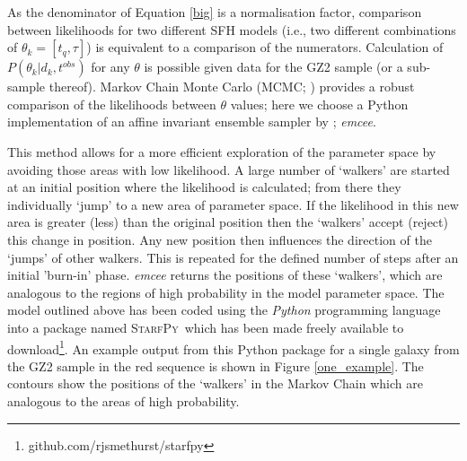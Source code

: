 \documentclass[useAMS,usenatbib]{mn2e}
\def\changed    {\color{titlecol} }
\def\starfpy {\textsc{StarfPy}}
\begin{document}
As the denominator of Equation \ref{big} is a normalisation factor, comparison between likelihoods for two different SFH models (i.e., two different combinations of $\theta_k = [t_q, \tau]$) is equivalent to a comparison of the numerators. Calculation of $P(\theta_k|d_k, t^{obs})$  for any $\theta$ is possible given data for the GZ2 sample (or a sub-sample thereof). Markov Chain Monte Carlo (MCMC; \citealt{MacKay, Dan, GW10}) provides a robust comparison of the likelihoods between $\theta$ values; here we choose a Python implementation of an affine invariant ensemble sampler by \cite{Dan}; \emph{emcee}.

This method allows for a more efficient exploration of the parameter space by avoiding those areas with low likelihood. A large number of `walkers' are started at an initial position where the likelihood is calculated; from there they individually `jump' to a new area of parameter space. If the likelihood in this new area is greater (less) than the original position then the `walkers' accept (reject) this change in position. Any new position then influences the direction of the  `jumps' of other walkers.  {\changed This is repeated for the defined number of steps after an initial 'burn-in' phase. \emph{emcee} returns the positions of these `walkers', which are analogous to the regions of high probability in the model parameter space.} The model outlined above has been coded using the \emph{Python} programming language into a package named \starfpy ~which has been made freely available to download\footnote{{\changed github.com/rjsmethurst/starfpy}}. {\changed An example output from this Python package for a single galaxy from the GZ2 sample in the red sequence is shown in Figure \ref{one_example}. The contours show the positions of the `walkers' in the Markov Chain which are analogous to the areas of high probability.}
\end{document}
